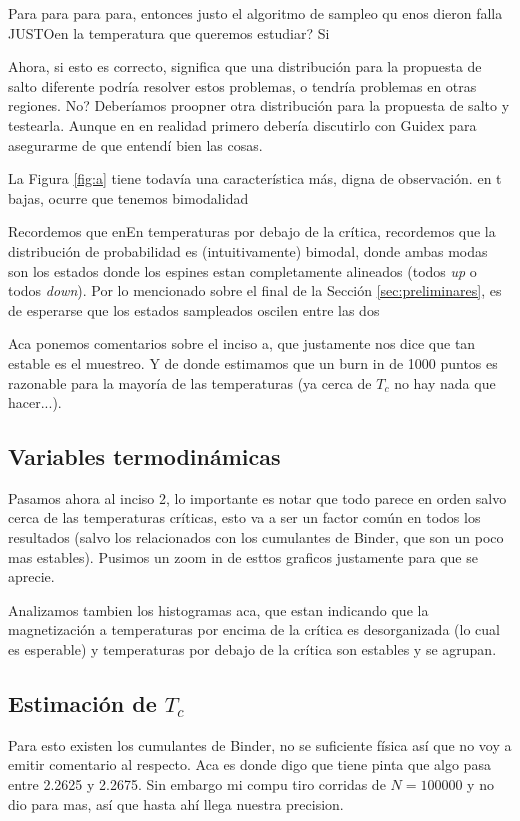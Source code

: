 \documentclass[a4paper,12pt]{article}
\begin{document}
Para para para para, entonces justo el algoritmo de sampleo qu enos dieron falla JUSTOen la temperatura que queremos estudiar? Si

Ahora, si esto es correcto, significa que una distribución para la propuesta de salto diferente podría resolver estos problemas, o tendría problemas en otras regiones. No? Deberíamos proopner otra distribución para la propuesta de salto y testearla. Aunque en en realidad primero debería discutirlo con Guidex para asegurarme de que entendí bien las cosas.

La Figura \ref{fig:a} tiene todavía una característica más, digna de observación. en t bajas, ocurre que tenemos bimodalidad

Recordemos que enEn temperaturas por debajo de la crítica, recordemos que la distribución de probabilidad es (intuitivamente) bimodal, donde ambas modas son los estados donde los espines estan completamente alineados (todos {\it up} o todos {\it down}). Por lo mencionado sobre el final de la Sección \ref{sec:preliminares}, es de esperarse que los estados sampleados oscilen entre las dos 

Aca ponemos comentarios sobre el inciso a, que justamente nos dice que tan estable es el muestreo. Y de donde estimamos que un burn in de 1000 puntos es razonable para la mayoría de las temperaturas (ya cerca de $T_c$ no hay nada que hacer...).

\subsection{Variables termodinámicas}

Pasamos ahora al inciso 2, lo importante es notar que todo parece en orden salvo cerca de las temperaturas críticas, esto va a ser un factor común en todos los resultados (salvo los relacionados con los cumulantes de Binder, que son un poco mas estables). Pusimos un zoom in de esttos graficos justamente para que se aprecie.

Analizamos tambien los histogramas aca, que estan indicando que la magnetización a temperaturas por encima de la crítica es desorganizada (lo cual es esperable) y temperaturas por debajo de la crítica son estables y se agrupan.

\subsection{Estimación de $T_c$}

Para esto existen los cumulantes de Binder, no se suficiente física así que no voy a emitir comentario al respecto. Aca es donde digo que tiene pinta que algo pasa entre 2.2625 y 2.2675. Sin embargo mi compu tiro corridas de $N = 100000$ y no dio para mas, así que hasta ahí llega nuestra precision.
\end{document}
